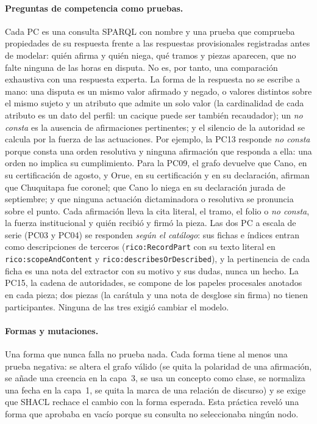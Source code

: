 \documentclass[runningheads]{llncs}
\newcommand{\ttt}[1]{\texttt{\small #1}}
\begin{document}
\paragraph{Preguntas de competencia como pruebas.}
Cada PC es una consulta SPARQL con nombre y una prueba que comprueba propiedades de su respuesta frente a las
respuestas provisionales registradas antes de modelar: quién afirma y quién niega, qué tramos y piezas aparecen, que
no falte ninguna de las horas en disputa. No es, por tanto, una comparación exhaustiva con una respuesta experta. La
forma de la respuesta no se escribe a mano: una disputa es un mismo valor afirmado y negado, o valores distintos
sobre el mismo sujeto y un atributo que admite un solo valor (la cardinalidad de cada atributo es un dato del
perfil: un cacique puede ser también recaudador); un \emph{no consta} es la ausencia de afirmaciones pertinentes; y el silencio de la
autoridad se calcula por la fuerza de las actuaciones. Por ejemplo, la PC13 responde \emph{no consta} porque consta
una orden resolutiva y ninguna afirmación que responda a ella: una orden no implica su cumplimiento. Para la PC09, el
grafo devuelve que Cano, en su certificación de agosto, y Orue, en su certificación y en su declaración, afirman que
Chuquitapa fue coronel; que Cano lo niega en su declaración jurada de septiembre; y que ninguna actuación dictaminadora
o resolutiva se pronuncia sobre el punto. Cada afirmación lleva la cita literal, el tramo, el folio o \emph{no
consta}, la fuerza institucional y quién recibió y firmó la pieza. Las dos PC a escala de serie (PC03 y PC04) se
responden \emph{según el catálogo}: sus fichas e índices entran como descripciones de terceros
(\ttt{rico:RecordPart} con su texto literal en \ttt{rico:scopeAndContent} y \ttt{rico:describesOrDescribed}), y la
pertinencia de cada ficha es una nota del extractor con su motivo y sus dudas, nunca un hecho. La PC15, la cadena de
autoridades, se compone de los papeles procesales anotados en cada pieza; dos piezas (la carátula y una nota de
desglose sin firma) no tienen participantes. Ninguna de las tres exigió cambiar el modelo.

\paragraph{Formas y mutaciones.}
Una forma que nunca falla no prueba nada. Cada forma tiene al menos una prueba negativa: se altera el grafo válido (se
quita la polaridad de una afirmación, se añade una creencia en la capa~3, se usa un concepto como clase, se normaliza
una fecha en la capa~1, se quita la marca de una relación de discurso) y se exige que SHACL rechace el cambio con la
forma esperada. Esta práctica reveló una forma que aprobaba en vacío porque su consulta no seleccionaba ningún nodo.
\end{document}
